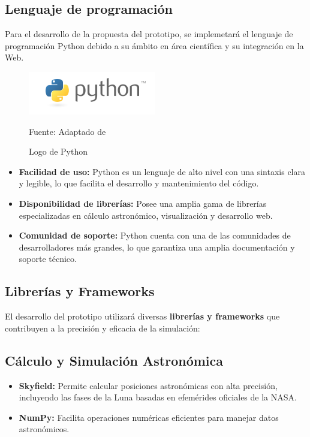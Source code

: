 \subsection{Lenguaje de programación}
Para el desarrollo de la propuesta del prototipo, se implemetará el lenguaje de programación Python debido 
a su ámbito en área científica y su integración en la Web.

\begin{figure}[H]
    \includegraphics[scale = 0.80]{Imagenes/python-logo.png}
    \centering
    \caption{Logo de Python}{Fuente: Adaptado de \cite{}}
\end{figure}

\begin{itemize}
    \item \textbf{Facilidad de uso:} Python es un lenguaje de alto nivel con una sintaxis clara y legible, lo que facilita el desarrollo y mantenimiento del código.
    \item \textbf{Disponibilidad de librerías:} Posee una amplia gama de librerías especializadas en cálculo astronómico, visualización y desarrollo web.
    \item \textbf{Comunidad de soporte:} Python cuenta con una de las comunidades de desarrolladores más grandes, lo que garantiza una amplia documentación y soporte técnico.
\end{itemize}

\subsection{Librerías y Frameworks}

El desarrollo del prototipo utilizará diversas \textbf{librerías y frameworks} que contribuyen a la precisión y eficacia de la simulación:

\subsection{Cálculo y Simulación Astronómica}
\begin{itemize}
    \item \textbf{Skyfield:} Permite calcular posiciones astronómicas con alta precisión, incluyendo las fases de la Luna basadas en efemérides oficiales de la NASA.
    \item \textbf{NumPy:} Facilita operaciones numéricas eficientes para manejar datos astronómicos.
\end{itemize}

